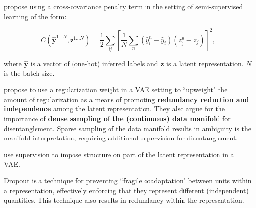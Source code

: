 \cite{cheung2014discovering} propose using a cross-covariance penalty term in the setting of semi-supervised learning of the form:

\begin{equation}
	C(\hat{\mathbf{y}}^{1 \dots N}, \mathbf{z}^{1 \dots N}) = \frac{1}{2} \sum_{ij} \left[ \frac{1}{N} \sum_n (\hat{y}^n_i - \bar{\hat{y}}_i) (z^n_j - \bar{z}_j) \right]^2,
\end{equation}

\noindent where $\hat{\mathbf{y}}$ is a vector of (one-hot) inferred labels and $\mathbf{z}$ is a latent representation. $N$ is the batch size.


\cite{higgins2016early} propose to use a regularization weight in a VAE setting to ``upweight" the amount of regularization as a means of promoting \textbf{redundancy reduction and independence} among the latent representation. They also argue for the importance of \textbf{dense sampling of the (continuous) data manifold} for disentanglement. Sparse sampling of the data manifold results in ambiguity is the manifold interpretation, requiring additional supervision for disentanglement.

\cite{siddharth2016inducing} use supervision to impose structure on part of the latent representation in a VAE.

Dropout \cite{srivastava2014dropout} is a technique for preventing ``fragile coadaptation" between units within a representation, effectively enforcing that they represent different (independent) quantities. This technique also results in redundancy within the representation.